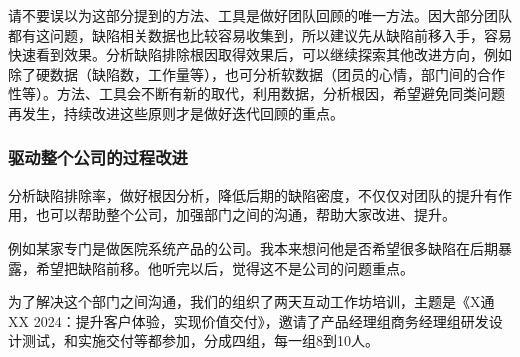 
请不要误以为这部分提到的方法、工具是做好团队回顾的唯一方法。因大部分团队都有这问题，缺陷相关数据也比较容易收集到，所以建议先从缺陷前移入手，容易快速看到效果。分析缺陷排除根因取得效果后，可以继续探索其他改进方向，例如除了硬数据（缺陷数，工作量等），也可分析软数据（团员的心情，部门间的合作性等）。方法、工具会不断有新的取代，利用数据，分析根因，希望避免同类问题再发生，持续改进这些原则才是做好迭代回顾的重点。

\hypertarget{ux9a71ux52a8ux6574ux4e2aux516cux53f8ux7684ux8fc7ux7a0bux6539ux8fdb}{%
\subsubsection{驱动整个公司的过程改进}\label{ux9a71ux52a8ux6574ux4e2aux516cux53f8ux7684ux8fc7ux7a0bux6539ux8fdb}}

分析缺陷排除率，做好根因分析，降低后期的缺陷密度，不仅仅对团队的提升有作用，也可以帮助整个公司，加强部门之间的沟通，帮助大家改进、提升。

例如某家专门是做医院系统产品的公司。我本来想问他是否希望很多缺陷在后期暴露，希望把缺陷前移。他听完以后，觉得这不是公司的问题重点。




为了解决这个部门之间沟通，我们的组织了两天互动工作坊培训，主题是《X通XX
2024：提升客户体验，实现价值交付》，邀请了产品经理组商务经理组研发设计测试，和实施交付等都参加，分成四组，每一组8到10人。

